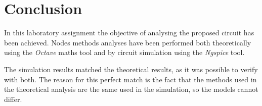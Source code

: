 \newpage



\section{Conclusion}
\label{sec:conclusion}

In this laboratory assignment the objective of analysing the proposed circuit has been
achieved. Nodes methods analyses have been performed both
theoretically using the \textit{Octave} maths tool and by circuit simulation using the
\textit{Ngspice} tool.

The simulation results matched the theoretical results, as it was possible to verify with both. The reason for this perfect match is the fact that the methods used in the theoretical analysis are the same used in the simulation, so the models cannot differ. 

